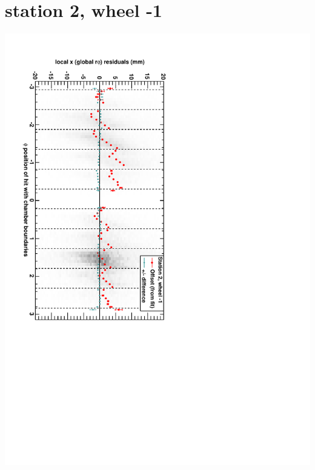 \documentclass[compress]{beamer}
\begin{document}
\section*{station 2, wheel -1}
\begin{frame} \vfill \mbox{\hspace{-1 cm}\includegraphics[height=1.2\linewidth, angle=90]{DTrphiVsPhi_st2_whB.pdf}} \end{frame}
\end{document}
